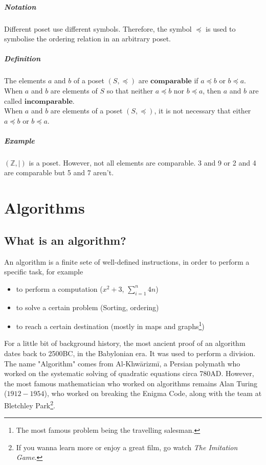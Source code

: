 \documentclass[10pt,a4paper]{book}
\begin{document}
\paragraph*{Notation}
Different poset use different symbols. Therefore, the symbol $\preceq$ is used to symbolise the ordering relation in an arbitrary poset.
\paragraph*{Definition}
The elements $a$ and $b$ of a poset $(S,\preceq)$ are $\mathbf{comparable}$ if $a \preceq b$ or $b \preceq a$.\\
When $a$ and $b$ are elements of $S$ so that neither $a \preceq b$ nor $b \preceq a$, then $a$ and $b$ are called $\mathbf{incomparable}$.\\
When $a$ and $b$ are elements of a poset $(S,\preceq)$, it is not necessary that either $a \preceq b$ or $b \preceq a$.
\paragraph*{Example}
$(\mathbb{Z},|)$ is a poset. However, not all elements are comparable. 3 and 9 or 2 and 4 are comparable but 5 and 7 aren't.

\chapter{Algorithms}

\section{What is an algorithm?}
An algorithm is a finite sete of well-defined instructions, in order to perform a specific task, for example
\begin{itemize}
\item to perform a computation ($x^2 + 3$, $\sum_{i=1}^{n} 4n$)
\item to solve a certain problem (Sorting, ordering)
\item to reach a certain destination (mostly in maps and graphs\footnote{The most famous problem being the travelling salesman.})
\end{itemize}
For a little bit of background history, the most ancient proof of an algorithm dates back to 2500BC, in the Babylonian era. It was used to perform a division. The name "Algorithm" comes from Al-Khwārizmī, a Persian polymath who worked on the systematic solving of quadratic equations circa 780AD. However, the most famous mathematician who worked on algorithms remains Alan Turing ($1912-1954$), who worked on breaking the Enigma Code, along with the team at Bletchley Park\footnote{If you wanna learn more or enjoy a great film, go watch \textit{The Imitation Game}.}.
\end{document}
